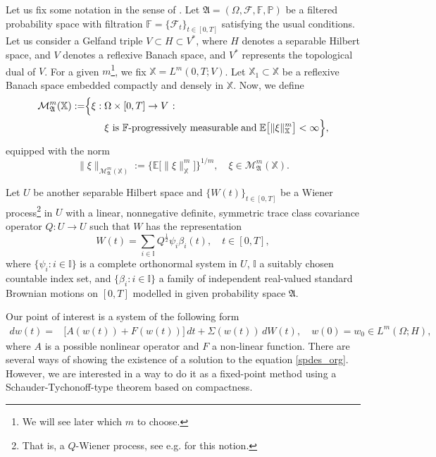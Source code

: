 \documentclass[english,a4paper,11pt]{amsart}
\theoremstyle{plain}
\theoremstyle{definition}
\theoremstyle{remark}
\numberwithin{equation}{section}
\newcommand{\EE}{ \mathbb{E} }
\newcommand{\Fcal} {{\mathcal F}}
\newcommand{\Mcal} {{\mathcal M}}
\newcommand{\Afrak} {{\mathfrak A}}
\renewcommand{\P}{\mathbb{P}}
\newcommand{\X}{\mathbb{X}}
\begin{document}
	
		Let us fix some notation in the sense of \cite[Chapter 5]{weiroeckner}. 
	Let $\Afrak=(\Omega,\Fcal,\mathbb{F},\P)$ be a filtered probability space
	with filtration $\mathbb{F}=\{\Fcal_{t}\}_{t\in [0,T]}$ satisfying the usual conditions.
	Let us consider a Gelfand triple $V\subset H\subset V^*$, where $H$ denotes a separable Hilbert space, and $V$ denotes a reflexive Banach space, and $V^*$ represents the topological dual of $V$. For a given $m$\footnote{We will see later which $m$ to choose.}, we fix $\X=L^m(0,T;V)$. Let $\X_1\subset \X$ be a reflexive Banach space embedded compactly and densely in $\X$.
	Now, we define
		\begin{equation*}
		\begin{aligned}  \Mcal_{\Afrak}^{m}(\X)
			:= & \Big\{ \xi:\Omega\times[0,T]\to V\;\colon\;\\
			&\qquad\text{\ensuremath{\xi} is \ensuremath{\mathbb{F}}-progressively measurable}\;\text{and}\;\EE\big[\|\xi\|_{\X}^{m}\big]<\infty\Big\},
		\end{aligned}
	\end{equation*}
	equipped with the norm
	\[
	\|\xi\|_{\Mcal_{\Afrak}^{m}(\X)}:=\Big\{\EE\big[\|\xi\|_{\X}^{m}\big]\Big\}^{1/m},\quad\xi\in\Mcal_{\Afrak}^{m}(\X).
	\]
	
	Let $U$ be another separable Hilbert space and $\{W(t)\}_{t\in [0,T]}$ be a Wiener process\footnote{That is, a $Q$-Wiener process, see e.g. \cite{DaPrZa:2nd} for this notion.} in $U$ with a linear, nonnegative definite, symmetric trace class covariance
	operator $Q:U\to U$ such that $W$ has the representation
	$$
	W(t)=\sum_{i\in\mathbb{I}} Q^\frac 12 \psi_i\beta_i(t),\quad t\in [0,T],
	$$
	where $\{\psi_i:i\in \mathbb{I}\}$ is a complete orthonormal system in $U$, $\mathbb{I}$ a suitably chosen countable index set, and $\{\beta_i:i\in\mathbb{I}\}$ a family of independent real-valued standard Brownian motions on $[0,T]$ modelled in given probability space $\Afrak$.
	
	
Our point of interest is a system of the following form
		\begin{align} \label{spdes_org}
		dw(t) =&\big[{A} (w(t))+ {F(w(t))}\big]\, dt +\Sigma(w(t))\,dW(t),\quad w(0)=w_0\in L^m(\Omega;H),
	\end{align}
	where $A$ is a possible nonlinear operator and $F$ a non-linear function.  There are several ways of showing the existence of a solution to the equation \eqref{spdes_org}. However, we are interested in a way to do it as a fixed-point method using a Schauder-Tychonoff-type theorem based on compactness.
	
\end{document}
